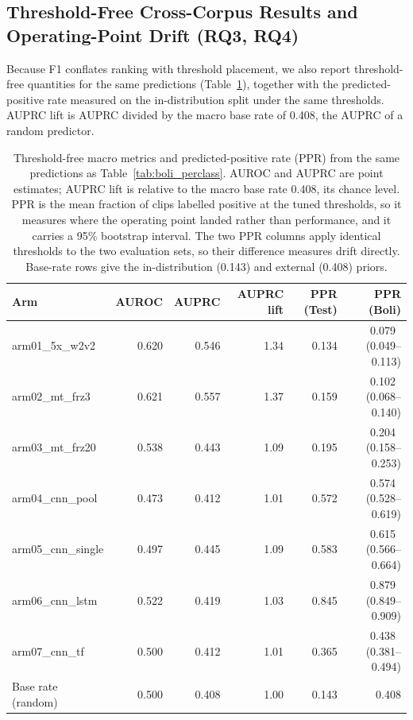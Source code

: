 \documentclass[a4paper,orivec]{llncs}
\newcommand{\ci}[1]{{\scriptsize\,(#1)}}
\begin{document}
\subsection{Threshold-Free Cross-Corpus Results and Operating-Point Drift (RQ3, RQ4)}
\label{sec:res-thresholdfree}
Because F1 conflates ranking with threshold placement, we also report
threshold-free quantities for the same predictions
(Table~\ref{tab:boli_drift}), together with the predicted-positive rate measured
on the in-distribution split under the same thresholds. AUPRC lift is AUPRC
divided by the macro base rate of 0.408, the AUPRC of a random predictor.

\begin{table}[!htbp]
\caption{Threshold-free macro metrics and predicted-positive rate (PPR) from the
same predictions as Table~\ref{tab:boli_perclass}. AUROC and AUPRC are point
estimates; AUPRC lift is relative to the macro base rate 0.408, its chance level.
PPR is the mean fraction of clips labelled positive at the tuned thresholds, so it
measures where the operating point landed rather than performance, and it carries
a 95\% bootstrap interval. The two PPR columns apply identical thresholds to the
two evaluation sets, so their difference measures drift directly. Base-rate rows
give the in-distribution (0.143) and external (0.408) priors.}
\label{tab:boli_drift}
\centering
\small
\renewcommand{\arraystretch}{0.9}
\setlength{\tabcolsep}{2pt}
\begin{tabular}{lrrrrr}
\hline
Arm & AUROC & AUPRC & AUPRC lift & PPR (Test) & PPR (Boli)\\
\hline
arm01\_5x\_w2v2 & 0.620 & 0.546 & 1.34 & 0.134 & 0.079 \ci{0.049--0.113}\\
arm02\_mt\_frz3 & 0.621 & 0.557 & 1.37 & 0.159 & 0.102 \ci{0.068--0.140}\\
arm03\_mt\_frz20 & 0.538 & 0.443 & 1.09 & 0.195 & 0.204 \ci{0.158--0.253}\\
arm04\_cnn\_pool & 0.473 & 0.412 & 1.01 & 0.572 & 0.574 \ci{0.528--0.619}\\
arm05\_cnn\_single & 0.497 & 0.445 & 1.09 & 0.583 & 0.615 \ci{0.566--0.664}\\
arm06\_cnn\_lstm & 0.522 & 0.419 & 1.03 & 0.845 & 0.879 \ci{0.849--0.909}\\
arm07\_cnn\_tf & 0.500 & 0.412 & 1.01 & 0.365 & 0.438 \ci{0.381--0.494}\\
\hline
Base rate (random) & 0.500 & 0.408 & 1.00 & 0.143 & 0.408\\
\hline
\end{tabular}
\end{table}
\end{document}
